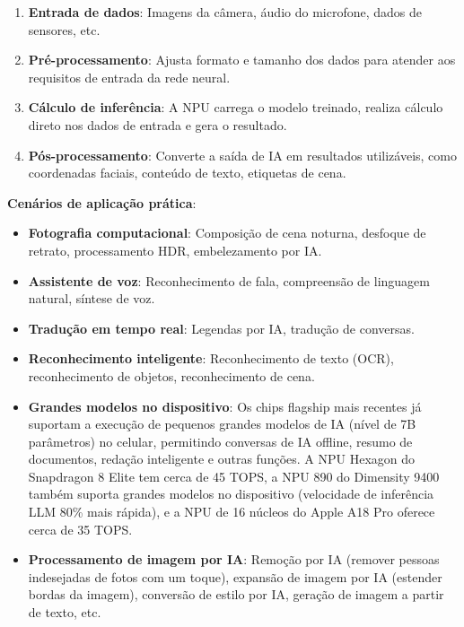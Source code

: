 \begin{enumerate}
  \item \textbf{Entrada de dados}: Imagens da câmera, áudio do microfone, dados de sensores, etc.
  \item \textbf{Pré-processamento}: Ajusta formato e tamanho dos dados para atender aos requisitos de entrada da rede neural.
  \item \textbf{Cálculo de inferência}: A NPU carrega o modelo treinado, realiza cálculo direto nos dados de entrada e gera o resultado.
  \item \textbf{Pós-processamento}: Converte a saída de IA em resultados utilizáveis, como coordenadas faciais, conteúdo de texto, etiquetas de cena.
\end{enumerate}

\textbf{Cenários de aplicação prática}:

\begin{itemize}
  \item \textbf{Fotografia computacional}: Composição de cena noturna, desfoque de retrato, processamento HDR, embelezamento por IA.
  \item \textbf{Assistente de voz}: Reconhecimento de fala, compreensão de linguagem natural, síntese de voz.
  \item \textbf{Tradução em tempo real}: Legendas por IA, tradução de conversas.
  \item \textbf{Reconhecimento inteligente}: Reconhecimento de texto (OCR), reconhecimento de objetos, reconhecimento de cena.
  \item \textbf{Grandes modelos no dispositivo}: Os chips flagship mais recentes já suportam a execução de pequenos grandes modelos de IA (nível de 7B parâmetros) no celular, permitindo conversas de IA offline, resumo de documentos, redação inteligente e outras funções. A NPU Hexagon do Snapdragon 8 Elite tem cerca de 45 TOPS, a NPU 890 do Dimensity 9400 também suporta grandes modelos no dispositivo (velocidade de inferência LLM 80\% mais rápida), e a NPU de 16 núcleos do Apple A18 Pro oferece cerca de 35 TOPS.
  \item \textbf{Processamento de imagem por IA}: Remoção por IA (remover pessoas indesejadas de fotos com um toque), expansão de imagem por IA (estender bordas da imagem), conversão de estilo por IA, geração de imagem a partir de texto, etc.
\end{itemize}


